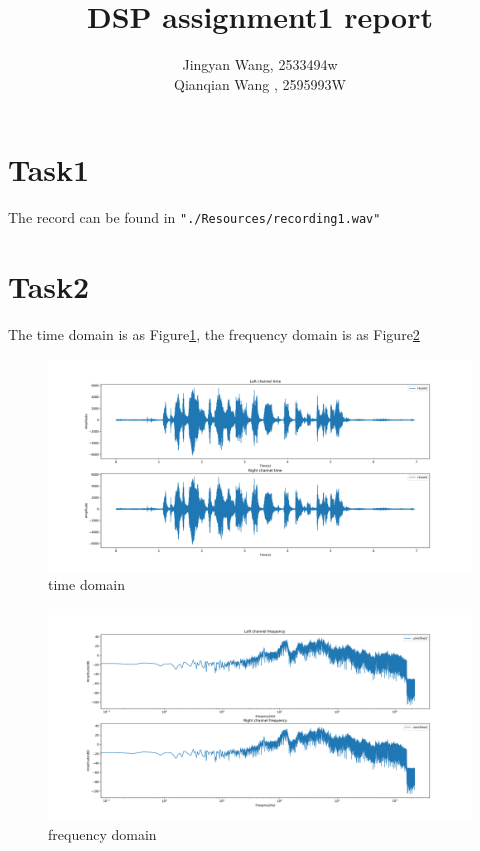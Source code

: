 \documentclass[a4paper,12pt]{article}
\begin{document}
%
   \title{\textbf{DSP assignment1 report}}

   \author{Jingyan Wang, 2533494w \\ Qianqian Wang , 2595993W}
          
   \date{}

   \maketitle
   
   \tableofcontents
 
  \newpage

\section{Task1}
The record can be found in \lstinline|"./Resources/recording1.wav"|
\section{Task2}
The time domain is as Figure\ref{fig_recordT}, the frequency domain is as Figure\ref{fig_recordF}
\begin{figure}[h]   
	\centering 
	\includegraphics[width=12cm]{../Output/Figures/recordT} 
	\caption{time domain}   
	\label{fig_recordT}
\end{figure}
\begin{figure}[h]   
	\centering 
	\includegraphics[width=12cm]{../Output/Figures/recordF} 
	\caption{frequency domain}   
	\label{fig_recordF}
\end{figure}
\end{document}
